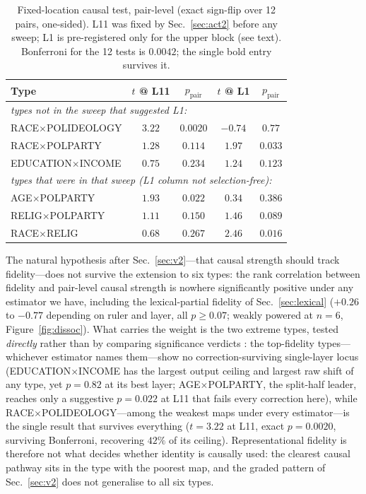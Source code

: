 \begin{table}[t]
\centering
\caption{Fixed-location causal test, pair-level (exact sign-flip over 12
pairs, one-sided). L11 was fixed by Sec.~\ref{sec:act2} before any
sweep; L1 is pre-registered only for the upper block (see text).
Bonferroni for the 12 tests is $0.0042$; the single bold entry survives
it.}
\label{tab:fixedlayer}
\begin{tabular}{lcccc}
\toprule
Type & $t$ @ L11 & $p_{\text{pair}}$ & $t$ @ L1 & $p_{\text{pair}}$ \\
\midrule
\multicolumn{5}{l}{\emph{types not in the sweep that suggested L1:}} \\
RACE$\times$POLIDEOLOGY  & $\mathbf{3.22}$ & $\mathbf{0.0020}$ & $-0.74$ & $0.77$ \\
RACE$\times$POLPARTY     & $1.28$ & $0.114$ & $1.97$ & $0.033$ \\
EDUCATION$\times$INCOME  & $0.75$ & $0.234$ & $1.24$ & $0.123$ \\
\midrule
\multicolumn{5}{l}{\emph{types that were in that sweep (L1 column not selection-free):}} \\
AGE$\times$POLPARTY      & $1.93$ & $0.022$ & $0.34$ & $0.386$ \\
RELIG$\times$POLPARTY    & $1.11$ & $0.150$ & $1.46$ & $0.089$ \\
RACE$\times$RELIG        & $0.68$ & $0.267$ & $2.46$ & $0.016$ \\
\bottomrule
\end{tabular}
\end{table}

The natural hypothesis after Sec.~\ref{sec:v2}---that causal strength
should track fidelity---does not survive the extension to six types: the
rank correlation between fidelity and pair-level causal strength is
nowhere significantly positive under any estimator we have, including
the lexical-partial fidelity of Sec.~\ref{sec:lexical} ($+0.26$ to
$-0.77$ depending on ruler and layer, all $p \ge 0.07$; weakly powered at
$n{=}6$, Figure~\ref{fig:dissoc}). What carries the weight is the two
extreme types, tested \emph{directly} rather than by comparing
significance verdicts \citep{gelman2006}: the top-fidelity
types---whichever estimator names them---show no correction-surviving
single-layer locus (EDUCATION$\times$INCOME has the largest output
ceiling and largest raw shift of any type, yet $p=0.82$ at its best
layer; AGE$\times$POLPARTY, the split-half leader, reaches only a
suggestive $p=0.022$ at L11 that fails every correction here), while
RACE$\times$POLIDEOLOGY---among the weakest maps under every
estimator---is the single result that survives everything ($t=3.22$ at
L11, exact $p=0.0020$, surviving Bonferroni, recovering $42\%$ of its
ceiling). Representational fidelity is therefore not what decides
whether identity is causally used: the clearest causal pathway sits in
the type with the poorest map, and the graded pattern of Sec.~\ref{sec:v2}
does not generalise to all six types.

